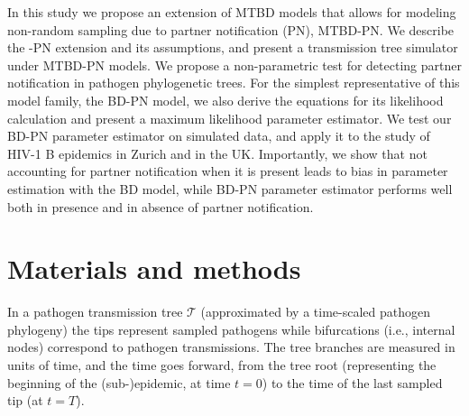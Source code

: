 \documentclass[10pt,letterpaper]{article}
\begin{document}
\bigskip

In this study we propose an extension of MTBD models that allows for modeling non-random sampling due to partner notification (PN), MTBD-PN. We describe the -PN extension and its assumptions, and present a transmission tree simulator under MTBD-PN models. We propose a non-parametric test for detecting partner notification in pathogen phylogenetic trees. For the simplest representative of this model family, the BD-PN model, we also derive the equations for its likelihood calculation and present a maximum likelihood parameter estimator. We test our BD-PN parameter estimator on simulated data, and apply it to the study of HIV-1 B epidemics in Zurich and in the UK. Importantly, we show that not accounting for partner notification when it is present leads to bias in parameter estimation with the BD model, while BD-PN parameter estimator performs well both in presence and in absence of partner notification.

\section*{Materials and methods}
In a pathogen transmission tree $\mathscr{T}$ (approximated by a time-scaled pathogen phylogeny) the tips represent sampled pathogens %
while bifurcations (i.e., internal nodes) correspond to pathogen transmissions. %
The tree branches are measured in units of time, and the time goes forward, from the tree root (representing the beginning of the (sub-)epidemic, at time $t=0$) to the time of the last sampled tip (at $t=T$). 

%
\end{document}
